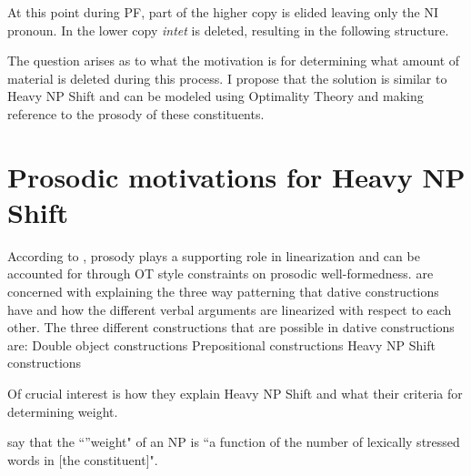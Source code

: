 \documentclass[12pt, letterpaper]{article}
\begin{document}
\ex At this point during PF, part of the higher copy is elided leaving only the NI pronoun. In the lower copy \emph{intet} is deleted, resulting in the following structure.
\ea \label{ex:tree} 
	\z

\ex The question arises as to what the motivation is for determining what amount of material is deleted during this process. I propose that the solution is similar to Heavy NP Shift and can be modeled using Optimality Theory \citep{princeOptimalityTheoryConstraint2004} and making reference to the prosody of these constituents.

\z 

\section{Prosodic motivations for Heavy NP Shift} \label{sec:HNPS}

\ea According to \citet{anttilaRoleProsodyEnglish2010}, prosody plays a supporting role in linearization and can be accounted for through OT style constraints on prosodic well-formedness. 
\ex \citeauthor{anttilaRoleProsodyEnglish2010} are concerned with explaining the three way patterning that dative constructions have and how the different verbal arguments are linearized with respect to each other. 
\ex The three different constructions that are possible in dative constructions are:
	\ea Double object constructions
	\ex Prepositional constructions
	\ex Heavy NP Shift constructions
	\z

\ex Of crucial interest is how they explain Heavy NP Shift and what their criteria for determining weight.

\ex \citet[949]{anttilaRoleProsodyEnglish2010} say that the ``''weight" of an NP is ``a function of the number of lexically stressed words in [the constituent]".
\end{document}
